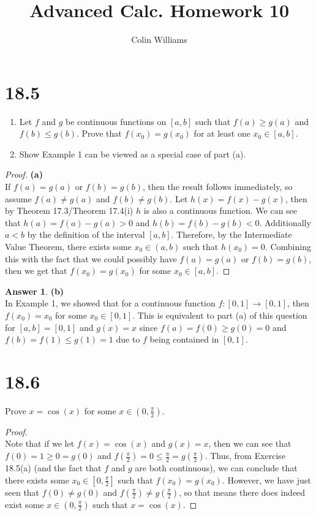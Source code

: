 \documentclass[10pt,a4paper]{article}
\title{Advanced Calc. Homework 10}
\author{Colin Williams}
\theoremstyle{definition}
\newtheorem*{answer*}{Answer}
\begin{document}
\maketitle

\section*{18.5}
\begin{enumerate}[label = (\alph*)]
\item Let $f$ and $g$ be continuous functions on $[a,b]$ such that $f(a) \geq g(a)$ and $f(b) \leq g(b)$. Prove that $f(x_0) = g(x_0)$ for at least one $x_0 \in [a,b]$.
\item Show Example 1 can be viewed as a special case of part (a).
\end{enumerate}

\begin{proof}{\textbf{(a)}}
\\If $f(a) = g(a)$ or $f(b) = g(b)$, then the result follows immediately, so assume $f(a) \neq g(a)$ and $f(b) \neq g(b)$. Let $h(x) = f(x) - g(x)$, then by Theorem 17.3/Theorem 17.4(i) $h$ is also a continuous function. We can see that $h(a) = f(a) - g(a) > 0$ and $h(b) = f(b) - g(b) < 0$. Additionally $a < b$ by the definition of the interval $[a,b]$. Therefore, by the Intermediate Value Theorem, there exists some $x_0 \in (a,b)$ such that $h(x_0) = 0$. Combining this with the fact that we could possibly have $f(a) = g(a)$ or $f(b) = g(b)$, then we get that $f(x_0) = g(x_0)$ for some $x_0 \in [a,b]$.
\end{proof}

\begin{answer*}{\textbf{(b)}}
\\In Example 1, we showed that for a continuous function $f: [0,1] \to [0,1]$, then $f(x_0) = x_0$ for some $x_0 \in [0,1]$. This is equivalent to part (a) of this question for $[a,b] = [0,1]$ and $g(x) = x$ since $f(a) = f(0) \geq g(0) = 0$ and $f(b) = f(1) \leq g(1) = 1$ due to $f$ being contained in $[0,1]$.
\end{answer*}

\section*{18.6}
Prove $x = \cos(x)$ for some $x \in \left(0, \frac{\pi}{2}\right)$.

\begin{proof}{$ $}
\\Note that if we let $f(x) = \cos(x)$ and $g(x) = x$, then we can see that $f(0) = 1 \geq 0 = g(0)$ and $f\left(\frac{\pi}{2}\right) = 0 \leq \frac{\pi}{2} = g\left(\frac{\pi}{2}\right)$. Thus, from Exercise 18.5(a) (and the fact that $f$ and $g$ are both continuous), we can conclude that there exists some $x_0 \in \left[0, \frac{\pi}{2}\right]$ such that $f(x_0) = g(x_0)$. However, we have just seen that $f(0) \neq g(0)$ and $f\left(\frac{\pi}{2}\right) \neq g\left(\frac{\pi}{2}\right)$, so that means there does indeed exist some $x \in \left(0, \frac{\pi}{2}\right)$ such that $x = \cos(x)$.
\end{proof}
\end{document}
